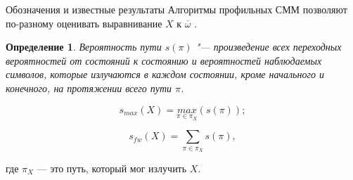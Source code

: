 \documentclass[ucs, notheorems, handout, 10pt]{beamer}
\newtheorem{defenition}{Определение}
\begin{document}
	\begin{frame}{Обозначения и известные результаты}				
		Алгоритмы профильных СММ позволяют по-разному оценивать выравнивание $X$ к $\overline{\omega}$ \cite{Dugad1996, Compeau2015a, Newberg2009}. 
		
		\begin{defenition}
			Вероятность пути $s(\pi)$ "--- произведение всех переходных вероятностей от состояний к состоянию и вероятностей наблюдаемых символов, которые излучаются в каждом состоянии, кроме начального и конечного, на протяжении всего пути $\pi$. 
		\end{defenition}		
		
		\begin{equation*}
			s_{max}(X) = \underset{\pi \in \pi_{X}}{max}(s(\pi)); \label{eq:1}
		\end{equation*}
		
		\begin{equation*}
			s_{fw}(X) = \sum_{\pi \in \pi_{X}}s(\pi), \label{eq:2}
		\end{equation*}
		
		где $\pi_{X}$ --- это путь, который мог излучить $X$.
		
	\end{frame}
	
\end{document}
